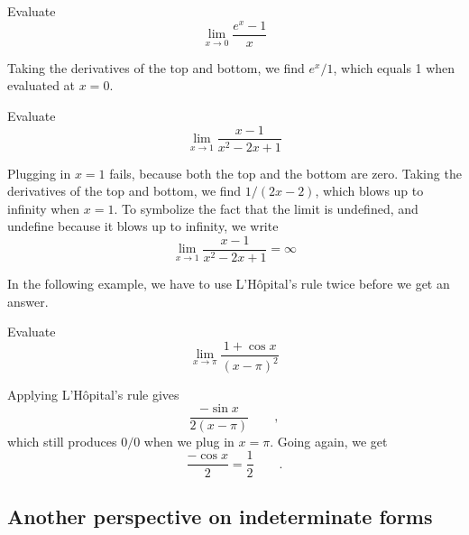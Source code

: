 \begin{eg}
\egquestion Evaluate
\begin{equation*}
  \lim_{x\rightarrow 0} \frac{e^x-1}{x}
\end{equation*}

\eganswer Taking the derivatives of the top and bottom, we find $e^x/1$, which equals 1 when
evaluated at $x=0$.
\end{eg}

\begin{eg}
\egquestion Evaluate
\begin{equation*}
  \lim_{x\rightarrow 1} \frac{x-1}{x^2-2x+1}
\end{equation*}

\eganswer Plugging in $x=1$ fails, because both the top and the bottom are zero.
Taking the derivatives of the top and bottom, we find $1/(2x-2)$, which blows up to
infinity when $x=1$. To symbolize the fact that
the limit is undefined, and undefine because it blows up to infinity, we write
\begin{equation*}
  \lim_{x\rightarrow 1} \frac{x-1}{x^2-2x+1} = \infty
\end{equation*}
\end{eg}

In the following example, we have to use L'H\^{o}pital's rule twice before we get an answer.

\begin{eg}
\egquestion Evaluate
\begin{equation*}
  \lim_{x\rightarrow \pi} \frac{1+\cos x}{(x-\pi)^2}
\end{equation*}

\eganswer Applying  L'H\^{o}pital's rule gives
\begin{equation*}
  \frac{-\sin x}{2(x-\pi)} \qquad ,
\end{equation*}
which still produces $0/0$ when we plug in $x=\pi$. Going again, we get
\begin{equation*}
  \frac{-\cos x}{2} = \frac{1}{2} \qquad .
\end{equation*}
\end{eg}

\subsection{Another perspective on indeterminate forms}

